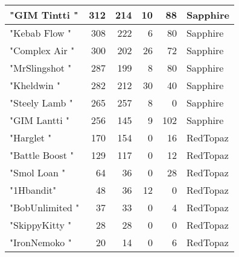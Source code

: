 \documentclass{article}
\begin{document}
\begin{table}[htbp]
\begin{tabular}{|l|r|r|r|r|l|}
"GIM Tintti " & 312 & 214 & 10 & 88 & Sapphire \\ \hline
"Kebab Flow " & 308 & 222 & 6 & 80 & Sapphire \\ \hline
"Complex Air " & 300 & 202 & 26 & 72 & Sapphire \\ \hline
"MrSlingshot " & 287 & 199 & 8 & 80 & Sapphire \\ \hline
"Kheldwin " & 282 & 212 & 30 & 40 & Sapphire \\ \hline
"Steely Lamb " & 265 & 257 & 8 & 0 & Sapphire \\ \hline
"GIM Lantti " & 256 & 145 & 9 & 102 & Sapphire \\ \hline
"Harglet " & 170 & 154 & 0 & 16 & RedTopaz \\ \hline
"Battle Boost " & 129 & 117 & 0 & 12 & RedTopaz \\ \hline
"Smol Loan " & 64 & 36 & 0 & 28 & RedTopaz \\ \hline
"1Hbandit" & 48 & 36 & 12 & 0 & RedTopaz \\ \hline
"BobUnlimited " & 37 & 33 & 0 & 4 & RedTopaz \\ \hline
"SkippyKitty " & 28 & 28 & 0 & 0 & RedTopaz \\ \hline
"IronNemoko " & 20 & 14 & 0 & 6 & RedTopaz \\ \hline
\end{tabular}
\end{table}
\end{document}

